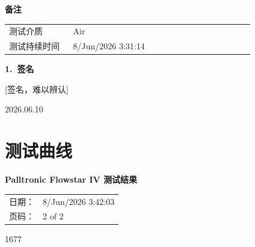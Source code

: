 \documentclass[UTF8,10pt,a4paper,fontset=fandol]{ctexart}
\newcommand{\fieldvalue}[1]{#1}
\newcommand{\handwritten}[1]{#1}
\begin{document}

\medskip
\noindent\textbf{备注}

\begin{tabular}{@{}p{0.24\linewidth}p{0.68\linewidth}@{}}
测试介质 &
\fieldvalue{Air}
\\
测试持续时间 &
\fieldvalue{8/Jun/2026 3:31:14}
\\
\end{tabular}

\medskip
\noindent\textbf{1.\ 签名}

\fieldvalue{\handwritten{[签名，难以辨认]}}

\handwritten{2026.06.10}

\bigskip
\section{测试曲线}

\begin{center}
\begin{minipage}{0.86\linewidth}
\centering
\textbf{Palltronic Flowstar IV 测试结果}

\vspace{0.5em}
\begin{tabular}{@{}ll@{}}
日期：&
\fieldvalue{8/Jun/2026 3:42:03}
\\
页码：&
\fieldvalue{2 of 2}
\\
\end{tabular}

\vspace{1em}

\vspace{0.5em}
\handwritten{1677}

\end{minipage}
\end{center}
\end{document}
